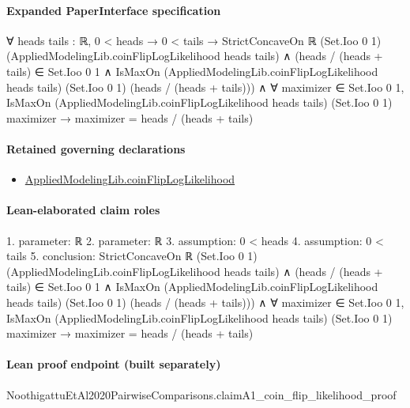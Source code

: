 \documentclass[10pt]{article}
\begin{document}
\paragraph{Expanded PaperInterface specification}
\begin{ReviewVerbatim}
∀ {heads tails : ℝ},
  0 < heads →
    0 < tails →
      StrictConcaveOn ℝ (Set.Ioo 0 1) (AppliedModelingLib.coinFlipLogLikelihood heads tails) ∧
        (heads / (heads + tails) ∈ Set.Ioo 0 1 ∧
            IsMaxOn (AppliedModelingLib.coinFlipLogLikelihood heads tails) (Set.Ioo 0 1) (heads / (heads + tails))) ∧
          ∀ maximizer ∈ Set.Ioo 0 1,
            IsMaxOn (AppliedModelingLib.coinFlipLogLikelihood heads tails) (Set.Ioo 0 1) maximizer →
              maximizer = heads / (heads + tails)
\end{ReviewVerbatim}

\paragraph{Retained governing declarations}
\begin{itemize}\raggedright
\item \hyperlink{governing-declaration-8938e760612a101c}{Applied\allowbreak{}Modeling\allowbreak{}Lib.\allowbreak{}coin\allowbreak{}Flip\allowbreak{}Log\allowbreak{}Likelihood}
\end{itemize}
\paragraph{Lean-elaborated claim roles}\begin{ReviewVerbatim}
1. parameter: ℝ
2. parameter: ℝ
3. assumption: 0 < heads
4. assumption: 0 < tails
5. conclusion: StrictConcaveOn ℝ (Set.Ioo 0 1) (AppliedModelingLib.coinFlipLogLikelihood heads tails) ∧
  (heads / (heads + tails) ∈ Set.Ioo 0 1 ∧
      IsMaxOn (AppliedModelingLib.coinFlipLogLikelihood heads tails) (Set.Ioo 0 1) (heads / (heads + tails))) ∧
    ∀ maximizer ∈ Set.Ioo 0 1,
      IsMaxOn (AppliedModelingLib.coinFlipLogLikelihood heads tails) (Set.Ioo 0 1) maximizer →
        maximizer = heads / (heads + tails)
\end{ReviewVerbatim}

\paragraph{Lean proof endpoint (built separately)}\begin{ReviewVerbatim}
NoothigattuEtAl2020PairwiseComparisons.claimA1_coin_flip_likelihood_proof
\end{ReviewVerbatim}
\end{document}
